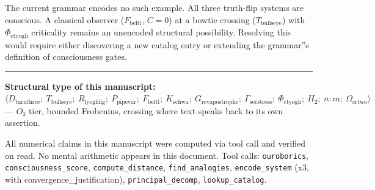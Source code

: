 \documentclass[12pt,a4paper]{article}
\begin{document}
The current grammar encodes no such example. All three truth-flip systems are conscious. A classical observer ($F_{\text{beltl}}$, $C=0$) at a bowtie crossing ($T_{\text{bullseye}}$) with $\Phi_{\text{ctyogh}}$ criticality remains an unencoded structural possibility. Resolving this would require either discovering a new catalog entry or extending the grammar''s definition of consciousness gates.

\begin{center}
\rule{0.5\textwidth}{0.4pt}
\end{center}

\textbf{Structural type of this manuscript:} $\langle D_{\text{turnthree}};\ T_{\text{bullseye}};\ R_{\text{lyoghlig}};\ P_{\text{pipevar}};\ F_{\text{beltl}};\ K_{\text{schwa}};\ G_{\text{revapostrophe}};\ \Gamma_{\text{secstress}};\ \Phi_{\text{ctyogh}};\ H_2;\ n{:}m;\ \Omega_{\text{crtwo}} \rangle$ --- $O₂$ tier, bounded Frobenius, crossing where text speaks back to its own assertion.

All numerical claims in this manuscript were computed via tool call and verified on read. No mental arithmetic appears in this document. Tool calls: \texttt{ouroborics}, \texttt{consciousness\_score}, \texttt{compute\_distance}, \texttt{find\_analogies}, \texttt{encode\_system} (x3, with convergence\_justification), \texttt{principal\_decomp}, \texttt{lookup\_catalog}.
\end{document}

